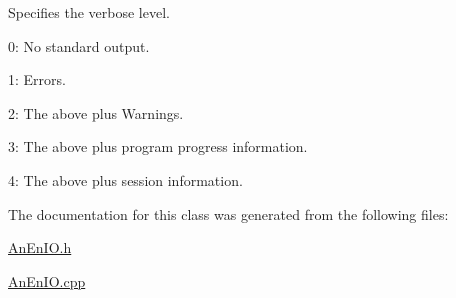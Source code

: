 Specifies the verbose level.
\begin{DoxyItemize}
\item 0\+: No standard output.
\item 1\+: Errors.
\item 2\+: The above plus Warnings.
\item 3\+: The above plus program progress information.
\item 4\+: The above plus session information. 
\end{DoxyItemize}

The documentation for this class was generated from the following files\+:\begin{DoxyCompactItemize}
\item 
\mbox{\hyperlink{_an_en_i_o_8h}{An\+En\+I\+O.\+h}}\item 
\mbox{\hyperlink{_an_en_i_o_8cpp}{An\+En\+I\+O.\+cpp}}\end{DoxyCompactItemize}

